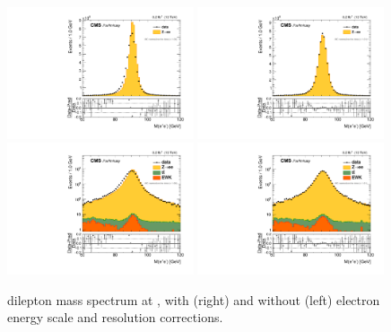 \begin{figure}[htbp]
\centering
\includegraphics[width=0.49\textwidth]{plots/LepScaleSmear/plotZee13TeV_noCorr/zee_norm.pdf}
\includegraphics[width=0.49\textwidth]{plots/LepScaleSmear/plotZee13TeV_corr/zee_norm.pdf}
\\
\includegraphics[width=0.49\textwidth]{plots/LepScaleSmear/plotZee13TeV_noCorr/zeelog_norm.pdf}
\includegraphics[width=0.49\textwidth]{plots/LepScaleSmear/plotZee13TeV_corr/zeelog_norm.pdf}
\caption{\zee dilepton mass spectrum at \serah, with (right) and without (left) electron energy scale and resolution corrections.}
\label{fig:lepscale:zee:13}
\end{figure}